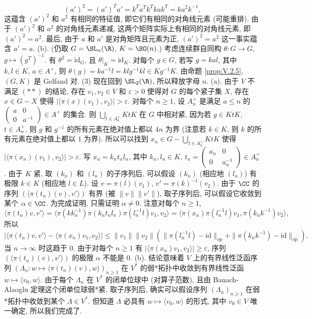 \begin{solution}
\[
(a')^2 = (a')^Ta' = k^Ta^Tk^Tkak^T = ka^2k^{-1},
\]
这蕴含 $(a')^2$ 和 $a^2$ 有相同的特征值, 即它们有相同的对角线元素 (可能重排). 由于 $(a')^2$ 和 $a^2$ 的对角线元素递减, 这两个矩阵实际上有相同的对角线元素, 即 $(a')^2 = a^2$. 最后, 由于 $a$ 和 $a'$ 是对角矩阵且元素为正, $(a')^2 = a^2$ 这一事实蕴含 $a' = a$.
(b). (仍取 $G = \SL_n(\R)$, $K = \SO(n)$.) 考虑连续群自同构 $\theta \colon G \to G$, $g \longmapsto (g^T)^{-1}$. 有 $\theta^2 = \mathrm{id}_G$, 且 $\theta|_K = \mathrm{id}_K$. 对每个 $g \in G$, 若写 $g = kal$, 其中 $k, l \in K$, $a \in A^+$, 则 $\theta(g) = ka^{-1}l = klg^{-1}kl \in Kg^{-1}K$. 由命题 \ref{prop:V.2.5}, $(G, K)$ 是 Gelfand 对.
(3) 现在回到 $\SL_2(\R)$, 所以释放字母 $n$.
(a). 由于 $V$ 不满足 $(**)$ 的结论, 存在 $v_1, v_2 \in V$ 和 $\varepsilon > 0$ 使得对 $G$ 的每个紧子集 $X$, 存在 $x \in G - X$ 使得 $|\langle \pi(x)(v_1), v_2 \rangle| > \varepsilon$.
对每个 $n \geq 1$, 设 $A_n^+$ 是满足 $a \leq n$ 的 $\begin{pmatrix} a & 0 \\ 0 & a^{-1} \end{pmatrix} \in A^+$ 的集合. 则 $\bigcup_{t \in A_n^+}KtK$ 在 $G$ 中相对紧, 因为若 $g \in KtK$, $t \in A_n^+$, 则 $g$ 和 $g^{-1}$ 的所有元素在绝对值上都以 $4n$ 为界 (注意若 $k \in K$, 则 $k$ 的所有元素在绝对值上都以 $1$ 为界). 所以可以找到 $x_n \in G - \bigcup_{t \in A_n^+}KtK$ 使得 $|\langle \pi(x_n)(v_1), v_2 \rangle| > \varepsilon$. 写 $x_n = k_nt_nl_n$, 其中 $k_n, l_n \in K$, $t_n = \begin{pmatrix} a_n & 0 \\ 0 & a_n^{-1} \end{pmatrix} \in A_n^+$. 由于 $K$ 紧, 取 $(k_n)$ 和 $(l_n)$ 的子序列后, 可以假设 $(k_n)$ (相应地 $(l_n)$) 有极限 $k \in K$ (相应地 $l \in L$). 设 $v = \pi(l)(v_1)$, $v' = \pi(k)^{-1}(v_2)$. 由于 $\CC$ 的序列 $(\langle \pi(t_n)(v), v' \rangle)$ 有界 (被 $\|v\|\|v'\|$), 取子序列后, 可以假设它收敛到某个 $\alpha \in \CC$. 为完成证明, 只需证明 $\alpha \neq 0$. 注意对每个 $n \geq 1$,
\[
\langle \pi(t_n)v, v' \rangle = \langle \pi(kk_n^{-1})\pi(k_nt_nl_n)\pi(l_n^{-1}l)v_1, v_2 \rangle = \langle \pi(x_n)\pi(l_n^{-1}l)v_1, \pi(k_nk^{-1})v_2 \rangle,
\]
所以
\[
|\langle \pi(t_n)v, v' \rangle - \langle \pi(x_n)v_1, v_2 \rangle| \leq \|v_1\|\|v_2\|(\|\pi(l_n^{-1}l) - \mathrm{id}\|_{\mathrm{op}} + \|\pi(k_nk^{-1}) - \mathrm{id}\|_{\mathrm{op}}).
\]
当 $n \to \infty$ 时这趋于 $0$. 由于对每个 $n \geq 1$ 有 $|\langle \pi(x_n)v_1, v_2 \rangle| \geq \varepsilon$, 序列 $(\langle \pi(t_n)(v), v' \rangle)$ 的极限 $\alpha$ 不能是 $0$.
(b). 结论意味着 $V$ 上的有界线性泛函序列 $(\Lambda_n \colon w \longmapsto \langle \pi(t_n)(v), w \rangle)_{n \geq 1}$ 在 $V^*$ 的弱*拓扑中收敛到有界线性泛函 $w \longmapsto \langle v_0, w \rangle$. 由于每个 $\Lambda_n$ 在 $V^*$ 的闭单位球中 (对算子范数), 且由 Banach-Alaoglu 定理这个闭单位球弱*紧, 取子序列后, 确实可以假设序列 $(\Lambda_n)_{n \geq 1}$ 在弱*拓扑中收敛到某个 $\Lambda \in V^*$. 但知道 $\Lambda$ 必具有 $w \longmapsto \langle v_0, w \rangle$ 的形式, 其中 $v_0 \in V$ 唯一确定, 所以我们完成了.

\end{solution}
